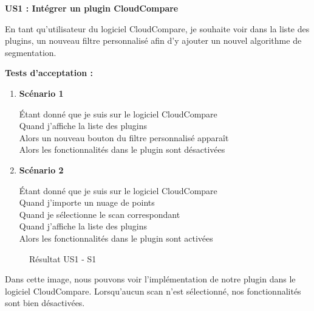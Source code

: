 \documentclass[12pt,titlepage,french]{article}
\begin{document}
\textbf{\og US1 : Intégrer un plugin CloudCompare\fg{}}

En tant qu'utilisateur du logiciel CloudCompare, je souhaite voir dans la liste des plugins, un nouveau filtre personnalisé afin d'y ajouter un nouvel algorithme de segmentation.

\textbf{Tests d'acceptation :}

\begin{enumerate}
    \item \textbf{Scénario 1}

Étant donné que je suis sur le logiciel CloudCompare\\
Quand j'affiche la liste des plugins\\
Alors un nouveau bouton du filtre personnalisé apparaît\\
Alors les fonctionnalités dans le plugin sont désactivées\\

    \item \textbf{Scénario 2}

Étant donné que je suis sur le logiciel CloudCompare\\
Quand j'importe un nuage de points \\
Quand je sélectionne le scan correspondant \\
Quand j'affiche la liste des plugins\\
Alors les fonctionnalités dans le plugin sont activées\\
\end{enumerate}

\begin{figure}[H]
    \caption{\label{} Résultat US1 - S1}
\end{figure}

Dans cette image, nous pouvons voir l'implémentation de notre plugin dans le logiciel CloudCompare. Lorsqu'aucun scan n'est sélectionné, nos fonctionnalités sont bien désactivées.
\end{document}
